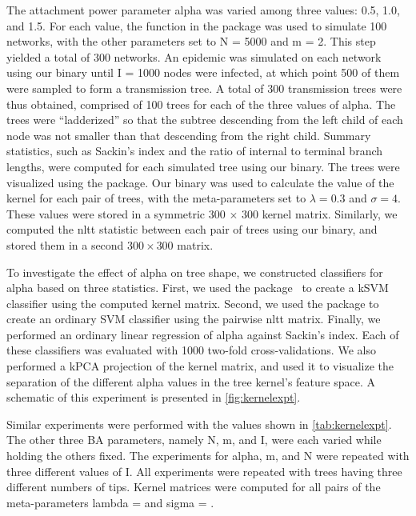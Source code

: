 The attachment power parameter \gls{alpha} was varied among three values: 0.5,
1.0, and 1.5. For each value, the  function in the
 package was used to simulate 100 networks, with the other
parameters set to \gls{N} = 5000 and \gls{m} = 2. This step yielded a total of
300 networks. An epidemic was simulated on each network using our
 binary until \gls{I} = 1000 nodes were infected, at which
point 500 of them were sampled to form a transmission tree. A total of 300
transmission trees were thus obtained, comprised of 100 trees for each of the
three values of \gls{alpha}. The trees were ``ladderized'' so that the subtree
descending from the left child of each node was not smaller than that
descending from the right child. Summary statistics, such as Sackin's index and
the ratio of internal to terminal branch lengths, were computed for each
simulated tree using our  binary. The trees were visualized
using the  package. Our  binary was used to
calculate the value of the kernel for each pair of trees, with the
meta-parameters set to $\lambda = 0.3$ and $\sigma = 4$. These values were
stored in a symmetric 300 $\times$ 300 kernel matrix. Similarly, we computed
the \gls{nltt} statistic between each pair of trees using our
 binary, and stored them in a second $300 \times 300$
matrix.

To investigate the effect of \gls{alpha} on tree shape, we constructed
classifiers for \gls{alpha} based on three statistics. First, we used the
 package~\autocite{karatzoglou2004kernlab} to create a
\gls{kSVM} classifier using the computed kernel matrix. Second, we used the
 package to create an ordinary \gls{SVM} classifier using the
pairwise \gls{nltt} matrix. Finally, we performed an ordinary linear regression
of \gls{alpha} against Sackin's index. Each of these classifiers was evaluated
with 1000 two-fold cross-validations. We also performed a \gls{kPCA} projection
of the kernel matrix, and used it to visualize the separation of the different
\gls{alpha} values in the tree kernel's feature space. A schematic of this
experiment is presented in \cref{fig:kernelexpt}.

Similar experiments were performed with the values shown in
\cref{tab:kernelexpt}. The other three \gls{BA} parameters, namely \gls{N},
\gls{m}, and \gls{I}, were each varied while holding the others fixed. The
experiments for \gls{alpha}, \gls{m}, and \gls{N} were repeated with three
different values of \gls{I}. All experiments were repeated with trees having
three different numbers of tips. Kernel matrices were computed for all pairs of
the meta-parameters \gls{lambda} =  and \gls{sigma} =
.

